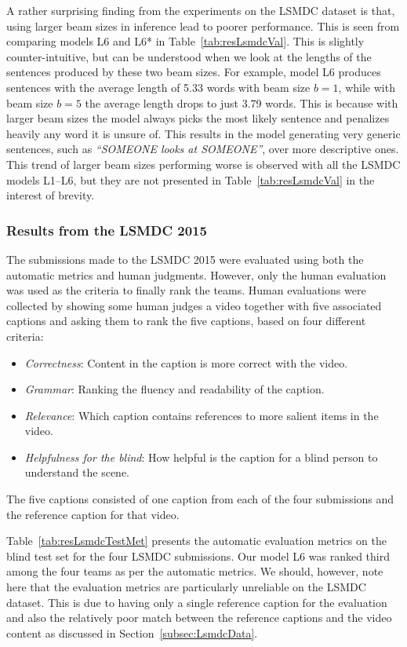 A rather surprising finding from the experiments on the LSMDC dataset is that,
using larger beam sizes in inference lead to poorer performance.
This is seen from comparing models L6 and L6* in Table~\ref{tab:resLsmdcVal}.
This is slightly counter-intuitive, but can be understood when we look at the
lengths of the sentences produced by these two beam sizes. 
For example, model L6 produces sentences with the average length of 5.33 words
with beam size $b=1$, while with beam size $b=5$ the average length drops to
just 3.79 words. 
This is because with larger beam sizes the model always picks the most likely
sentence and penalizes heavily any word it is unsure of.
This results in the model generating very generic sentences, such as
\emph{``SOMEONE looks at SOMEONE''}, over more descriptive ones.
This trend of larger beam sizes performing worse is observed with all the LSMDC
models L1--L6, but they are not presented in Table~\ref{tab:resLsmdcVal} in the
interest of brevity.

\subsubsection{Results from the LSMDC 2015}
\label{subsec:LSMDCChall}
The submissions made to the LSMDC 2015 were evaluated using both the automatic
metrics and human judgments.
However, only the human evaluation was used as the criteria to finally rank the teams.
Human evaluations were collected by showing some human judges a video together
with five associated captions and asking them to rank the five captions, based
on four different criteria:
\begin{itemize}
  \item \emph{Correctness}: Content in the caption is more correct with the video. 
  \item \emph{Grammar}: Ranking the fluency and readability of the caption. 
  \item \emph{Relevance}: Which caption contains references to more salient items in the video.
  \item \emph{Helpfulness for the blind}: How helpful is the caption for a
          blind person to understand the scene.
\end{itemize}
The five captions consisted of one caption from each of the four submissions and
the reference caption for that video.

Table~\ref{tab:resLsmdcTestMet} presents the automatic evaluation metrics on the
blind test set for the four LSMDC submissions.
Our model L6 was ranked third among the four teams as per the automatic metrics.
We should, however, note here that the evaluation metrics are particularly unreliable
on the LSMDC dataset.
This is due to having only a single reference caption for the evaluation and also
the relatively poor match between the reference captions and the video content
as discussed in Section~\ref{subsec:LsmdcData}.

